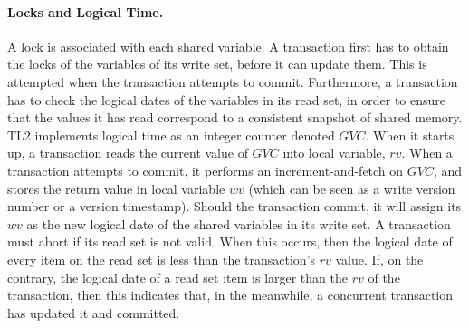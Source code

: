 \documentclass[runningheads,a4paper]{llncs}
\begin{document}
\paragraph{Locks and Logical Time.}
A lock is associated with each shared variable.  
A  transaction  first  has to  obtain  the  locks  of the
variables of its write set, before it can  
update them.  This is attempted when the transaction attempts to commit.
Furthermore, a  transaction has to  check the logical dates  of the
variables in its read set, in  
order to  ensure that  the values  it has read  correspond to  a consistent
snapshot of shared memory.  TL2 implements logical time as an integer counter denoted $\mathit{GVC}$.
When it starts up, a transaction reads the current value of $\mathit{GVC}$ into local variable, $\mathit{rv}$. 
When a transaction attempts to commit, it performs an increment-and-fetch on $\mathit{GVC}$, and stores the 
return value in local variable $\mathit{wv}$ (which can be seen as a write version number  or a version timestamp). 
Should the transaction commit, it will assign its $\mathit{wv}$ as the new logical date of the shared variables in its write set. 
A transaction must abort if its read set is not valid. When this occurs, then 
the logical date of every  item on the read set is less than the transaction{}'s $\mathit{rv}$  value. 
If, on the  contrary, the logical date of a read set  item is larger than the $\mathit{rv}$ 
of the transaction,  then this  indicates that,  in the meanwhile,  a concurrent  transaction 
has updated it and committed.
\end{document}
